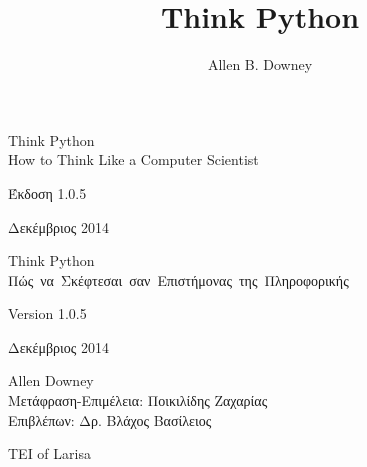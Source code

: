 \documentclass[10pt]{book}
\title{Think Python}
\author{Allen B. Downey}
\newcommand{\theversion}{1.0.5}
\newcommand{\thedate}{Δεκέμβριος 2014}
\newif\ifplastex
\begin{document}
\frontmatter

\ifplastex
    \usepackage{localdef}
    \maketitle

\newcount\anchorcnt
\newcommand*{\Anchor}[1]{%
  \@bsphack%
    \Hy@GlobalStepCount\anchorcnt%
    \edef\@currentHref{anchor.\the\anchorcnt}%
    \Hy@raisedlink{\hyper@anchorstart{\@currentHref}\hyper@anchorend}%
    \M@gettitle{}\label{#1}%
    \@esphack%
}


\else

\newtheorem{exercise}{Άσκηση}[chapter]


\begin{flushright}
\vspace*{2.0in}

\begin{spacing}{3}
{\huge Think Python}\\
{\Large How to Think Like a Computer Scientist}
\end{spacing}

\vspace{0.25in}

Έκδοση \theversion

\thedate

\vfill

\end{flushright}



\pagebreak
\thispagestyle{empty}

\begin{flushright}
\vspace*{2.0in}

\begin{spacing}{3}
{\huge Think Python}\\
{\Large Πώς~να~Σκέφτεσαι~σαν~Επιστήμονας~της~Πληροφορικής}
\end{spacing}

\vspace{0.25in}

Version \theversion

\thedate

\vspace{1in}


{\Large
Allen Downey\\
}
{Μετάφραση-Επιμέλεια: Ποικιλίδης Ζαχαρίας\\}
{Επιβλέπων: Δρ. Βλάχος Βασίλειος}

\vspace{0.5in}


{\Large ΤΕΙ of Larisa}

\vfill

\end{flushright}
\end{document}
